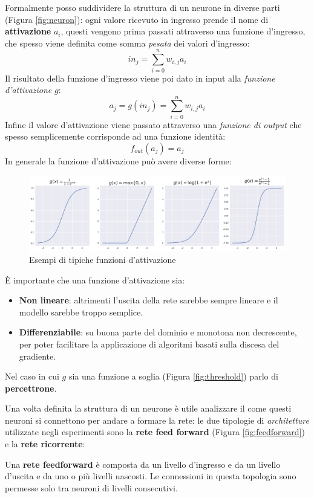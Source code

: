 \documentclass[../../main.tex]{subfiles}
\begin{document}
Formalmente posso suddividere la struttura di un neurone in diverse parti (Figura \ref{fig:neuron}): ogni valore ricevuto in ingresso prende il nome di \textbf{attivazione} $a_i$, questi vengono prima passati attraverso una funzione d'ingresso, che spesso viene definita come somma \textit{pesata} dei valori d'ingresso:
\[in_j = \sum_{i=0}^n {w_{i,j} a_i}\]
Il risultato della funzione d'ingresso viene poi dato in input alla \textit{funzione d'attivazione} $g$:
\[a_j = g(in_j) = \sum_{i=0}^n {w_{i,j} a_i}\]
Infine il valore d'attivazione viene passato attraverso una \textit{funzione di output} che spesso semplicemente corrisponde ad una funzione identità:
\[f_{out}(a_j) = a_j\]
In generale la funzione d'attivazione può avere diverse forme:

\begin{figure}[H]
    \centering
    \includegraphics[width=\textwidth]{immagini/4_2/activation_func.png}
    \caption{Esempi di tipiche funzioni d'attivazione}
    \label{fig:activations}
\end{figure}

È importante che una funzione d'attivazione sia:
\begin{itemize}
    \item \textbf{Non lineare}: altrimenti l’uscita della rete sarebbe sempre lineare e il modello sarebbe troppo semplice.
    \item \textbf{Differenziabile}: su buona parte del dominio e monotona non decrescente, per poter facilitare la applicazione di algoritmi basati sulla discesa del gradiente.
\end{itemize}
Nel caso in cui $g$ sia una funzione a soglia (Figura \ref{fig:threshold}) parlo di \textbf{percettrone}.

Una volta definita la struttura di un neurone è utile analizzare il come questi neuroni si connettono per andare a formare la rete: le due tipologie di \textit{architetture} utilizzate negli esperimenti sono la \textbf{rete feed forward} (Figura \ref{fig:feedforward}) e la \textbf{rete ricorrente}:

\begin{dfn}
    Una \textbf{rete feedforward} è composta da un livello d'ingresso e da un livello d'uscita e da uno o più livelli nascosti. Le connessioni in questa topologia sono permesse solo tra neuroni di livelli consecutivi.
\end{dfn}
\end{document}
